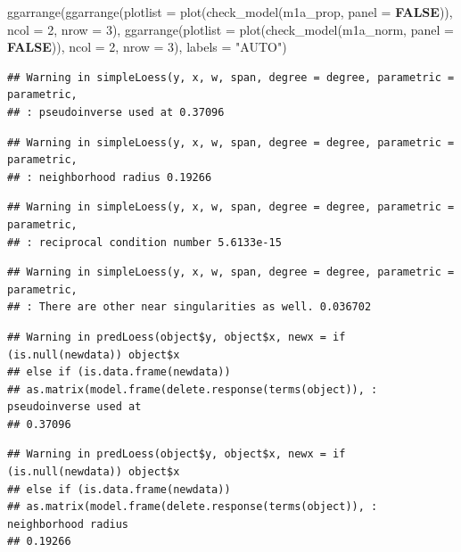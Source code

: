 \documentclass[
  bookmarksnumbered]{article}
\newenvironment{Shaded}{\begin{snugshade}}{\end{snugshade}}
\newcommand{\AttributeTok}[1]{\textcolor[rgb]{0.80,0.80,0.80}{#1}}
\newcommand{\ConstantTok}[1]{\textcolor[rgb]{0.86,0.64,0.64}{\textbf{#1}}}
\newcommand{\DecValTok}[1]{\textcolor[rgb]{0.86,0.86,0.80}{#1}}
\newcommand{\FunctionTok}[1]{\textcolor[rgb]{0.94,0.94,0.56}{#1}}
\newcommand{\NormalTok}[1]{\textcolor[rgb]{0.80,0.80,0.80}{#1}}
\newcommand{\StringTok}[1]{\textcolor[rgb]{0.80,0.58,0.58}{#1}}
\begin{document}
\begin{Shaded}
\begin{Highlighting}[]
\FunctionTok{ggarrange}\NormalTok{(}\FunctionTok{ggarrange}\NormalTok{(}\AttributeTok{plotlist =} \FunctionTok{plot}\NormalTok{(}\FunctionTok{check\_model}\NormalTok{(m1a\_prop, }\AttributeTok{panel =} \ConstantTok{FALSE}\NormalTok{)),}
                    \AttributeTok{ncol =} \DecValTok{2}\NormalTok{, }\AttributeTok{nrow =} \DecValTok{3}\NormalTok{),}
          \FunctionTok{ggarrange}\NormalTok{(}\AttributeTok{plotlist =} \FunctionTok{plot}\NormalTok{(}\FunctionTok{check\_model}\NormalTok{(m1a\_norm, }\AttributeTok{panel =} \ConstantTok{FALSE}\NormalTok{)),}
                    \AttributeTok{ncol =} \DecValTok{2}\NormalTok{, }\AttributeTok{nrow =} \DecValTok{3}\NormalTok{),}
          \AttributeTok{labels =} \StringTok{"AUTO"}\NormalTok{)}
\end{Highlighting}
\end{Shaded}

\begin{verbatim}
## Warning in simpleLoess(y, x, w, span, degree = degree, parametric = parametric,
## : pseudoinverse used at 0.37096
\end{verbatim}

\begin{verbatim}
## Warning in simpleLoess(y, x, w, span, degree = degree, parametric = parametric,
## : neighborhood radius 0.19266
\end{verbatim}

\begin{verbatim}
## Warning in simpleLoess(y, x, w, span, degree = degree, parametric = parametric,
## : reciprocal condition number 5.6133e-15
\end{verbatim}

\begin{verbatim}
## Warning in simpleLoess(y, x, w, span, degree = degree, parametric = parametric,
## : There are other near singularities as well. 0.036702
\end{verbatim}

\begin{verbatim}
## Warning in predLoess(object$y, object$x, newx = if (is.null(newdata)) object$x
## else if (is.data.frame(newdata))
## as.matrix(model.frame(delete.response(terms(object)), : pseudoinverse used at
## 0.37096
\end{verbatim}

\begin{verbatim}
## Warning in predLoess(object$y, object$x, newx = if (is.null(newdata)) object$x
## else if (is.data.frame(newdata))
## as.matrix(model.frame(delete.response(terms(object)), : neighborhood radius
## 0.19266
\end{verbatim}
\end{document}
